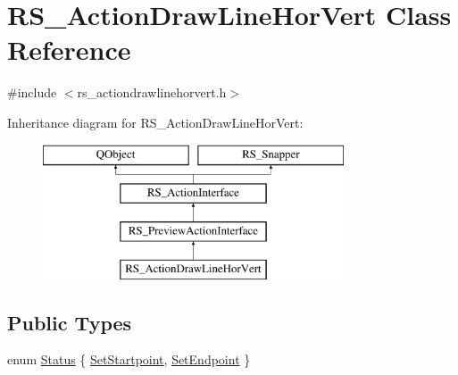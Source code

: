 \hypertarget{classRS__ActionDrawLineHorVert}{\section{R\-S\-\_\-\-Action\-Draw\-Line\-Hor\-Vert Class Reference}
\label{classRS__ActionDrawLineHorVert}
}


{\ttfamily \#include $<$rs\-\_\-actiondrawlinehorvert.\-h$>$}

Inheritance diagram for R\-S\-\_\-\-Action\-Draw\-Line\-Hor\-Vert\-:\begin{figure}[H]
\begin{center}
\leavevmode
\includegraphics[height=4.000000cm]{classRS__ActionDrawLineHorVert}
\end{center}
\end{figure}
\subsection*{Public Types}
\begin{DoxyCompactItemize}
\item 
enum \hyperlink{classRS__ActionDrawLineHorVert_aaadc1eb5957aadbc2698b0c74e820d20}{Status} \{ \hyperlink{classRS__ActionDrawLineHorVert_aaadc1eb5957aadbc2698b0c74e820d20ac260a554819a32f419ec69728e5108e6}{Set\-Startpoint}, 
\hyperlink{classRS__ActionDrawLineHorVert_aaadc1eb5957aadbc2698b0c74e820d20a6a0a6753b88d92a3d668917f10840bf2}{Set\-Endpoint}
 \}
\end{DoxyCompactItemize}
